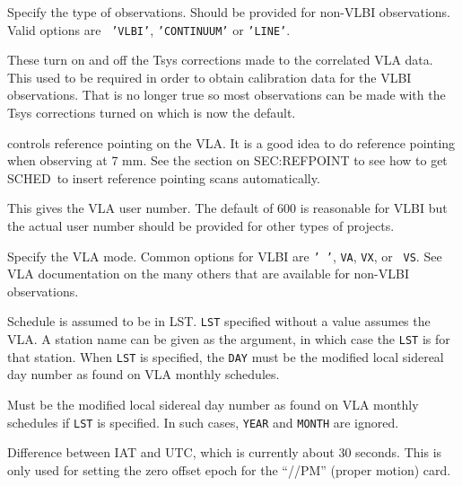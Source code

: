 \documentclass{report}
\newcommand{\schedb}{{\sc SCHED~}}
\begin{document}
\begin{list}{}{\parsep 0em  \itemsep 0em }

\item {} Specify the type of observations.
Should be provided for non-VLBI observations. Valid options are {\tt
'VLBI'}, {\tt 'CONTINUUM'} or {\tt 'LINE'}.

\item {} These turn on
and off the Tsys corrections made to the correlated VLA data. This
used to be required in order to obtain calibration data for the VLBI
observations. That is no longer true so most observations can be made
with the Tsys corrections turned on which is now the default.

\item {} controls reference pointing
on the VLA.  It is a good idea to do reference pointing when
observing at 7 mm.  See the section on 
{SEC:REFPOINT} to see how to get \schedb to insert reference pointing
scans automatically.

\item {} This gives the VLA user
number. The default of 600 is reasonable for VLBI but the actual user
number should be provided for other types of projects.

\item {} Specify the VLA mode.
Common options for VLBI are {\tt ' '}, {\tt VA}, {\tt VX}, or {\tt
VS}. See VLA documentation on the many others that are available
for non-VLBI observations.

\item {} Schedule is assumed to be in LST. {\tt LST}
specified without a value assumes the VLA. A station name can be given
as the argument, in which case the {\tt LST} is for that station. When
{\tt LST} is specified, the {\tt DAY} must be the modified local
sidereal day number as found on VLA monthly schedules.

\item {} Must be the modified local sidereal
day number as found on VLA monthly schedules if {\tt LST} is
specified. In such cases, {\tt YEAR} and {\tt MONTH} are ignored.

\item {} Difference between IAT and UTC,
which is currently about 30 seconds. This is only used for setting the
zero offset epoch for the ``//PM'' (proper motion) card.


\end{list}
\end{document}
